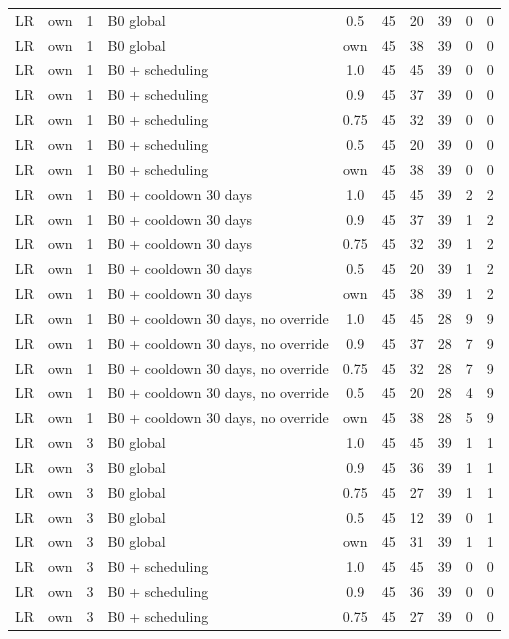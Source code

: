 \documentclass[10pt,onecolumn,letterpaper]{article}
\begin{document}
\begin{longtable}{lllp{4.4cm}cccccc}
LR & own & 1 & B0 global & 0.5 & 45 & 20 & 39 & 0 & 0 \\
LR & own & 1 & B0 global & own & 45 & 38 & 39 & 0 & 0 \\
LR & own & 1 & B0 + scheduling & 1.0 & 45 & 45 & 39 & 0 & 0 \\
LR & own & 1 & B0 + scheduling & 0.9 & 45 & 37 & 39 & 0 & 0 \\
LR & own & 1 & B0 + scheduling & 0.75 & 45 & 32 & 39 & 0 & 0 \\
LR & own & 1 & B0 + scheduling & 0.5 & 45 & 20 & 39 & 0 & 0 \\
LR & own & 1 & B0 + scheduling & own & 45 & 38 & 39 & 0 & 0 \\
LR & own & 1 & B0 + cooldown 30 days & 1.0 & 45 & 45 & 39 & 2 & 2 \\
LR & own & 1 & B0 + cooldown 30 days & 0.9 & 45 & 37 & 39 & 1 & 2 \\
LR & own & 1 & B0 + cooldown 30 days & 0.75 & 45 & 32 & 39 & 1 & 2 \\
LR & own & 1 & B0 + cooldown 30 days & 0.5 & 45 & 20 & 39 & 1 & 2 \\
LR & own & 1 & B0 + cooldown 30 days & own & 45 & 38 & 39 & 1 & 2 \\
LR & own & 1 & B0 + cooldown 30 days, no override & 1.0 & 45 & 45 & 28 & 9 & 9 \\
LR & own & 1 & B0 + cooldown 30 days, no override & 0.9 & 45 & 37 & 28 & 7 & 9 \\
LR & own & 1 & B0 + cooldown 30 days, no override & 0.75 & 45 & 32 & 28 & 7 & 9 \\
LR & own & 1 & B0 + cooldown 30 days, no override & 0.5 & 45 & 20 & 28 & 4 & 9 \\
LR & own & 1 & B0 + cooldown 30 days, no override & own & 45 & 38 & 28 & 5 & 9 \\
LR & own & 3 & B0 global & 1.0 & 45 & 45 & 39 & 1 & 1 \\
LR & own & 3 & B0 global & 0.9 & 45 & 36 & 39 & 1 & 1 \\
LR & own & 3 & B0 global & 0.75 & 45 & 27 & 39 & 1 & 1 \\
LR & own & 3 & B0 global & 0.5 & 45 & 12 & 39 & 0 & 1 \\
LR & own & 3 & B0 global & own & 45 & 31 & 39 & 1 & 1 \\
LR & own & 3 & B0 + scheduling & 1.0 & 45 & 45 & 39 & 0 & 0 \\
LR & own & 3 & B0 + scheduling & 0.9 & 45 & 36 & 39 & 0 & 0 \\
LR & own & 3 & B0 + scheduling & 0.75 & 45 & 27 & 39 & 0 & 0 \\

\end{longtable}
\end{document}

